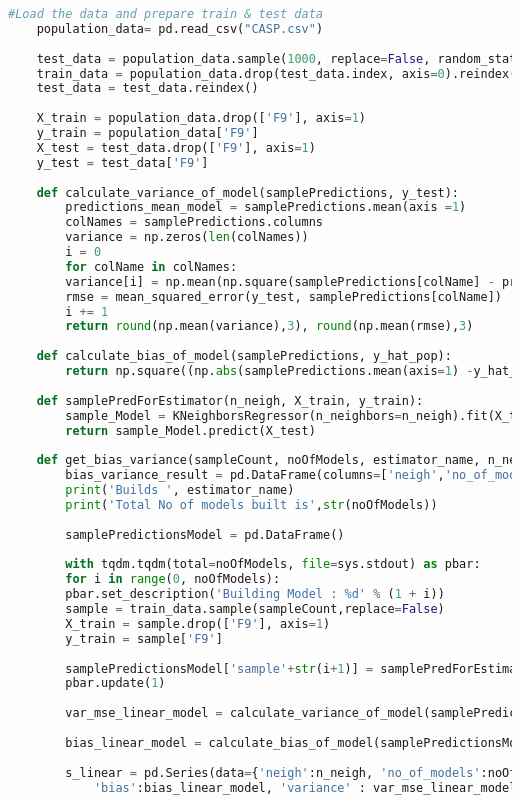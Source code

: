 \documentclass[a4paper]{article}
\begin{document}
\begin{appendices}
\begin{lstlisting}[language=Python]
	#Load the data and prepare train & test data
	population_data= pd.read_csv("CASP.csv")
	
	test_data = population_data.sample(1000, replace=False, random_state=100)
	train_data = population_data.drop(test_data.index, axis=0).reindex()
	test_data = test_data.reindex()
	
	X_train = population_data.drop(['F9'], axis=1)
	y_train = population_data['F9']
	X_test = test_data.drop(['F9'], axis=1)
	y_test = test_data['F9']
	
	def calculate_variance_of_model(samplePredictions, y_test):
		predictions_mean_model = samplePredictions.mean(axis =1)
		colNames = samplePredictions.columns
		variance = np.zeros(len(colNames))
		i = 0
		for colName in colNames:
		variance[i] = np.mean(np.square(samplePredictions[colName] - predictions_mean_model))
		rmse = mean_squared_error(y_test, samplePredictions[colName])
		i += 1
		return round(np.mean(variance),3), round(np.mean(rmse),3)
	
	def calculate_bias_of_model(samplePredictions, y_hat_pop):
		return np.square((np.abs(samplePredictions.mean(axis=1) -y_hat_pop).mean()))
	
	def samplePredForEstimator(n_neigh, X_train, y_train):
		sample_Model = KNeighborsRegressor(n_neighbors=n_neigh).fit(X_train, y_train)
		return sample_Model.predict(X_test)
	
	def get_bias_variance(sampleCount, noOfModels, estimator_name, n_neigh):
		bias_variance_result = pd.DataFrame(columns=['neigh','no_of_models','algorithm','bias','variance', 'mse'])
		print('Builds ', estimator_name)
		print('Total No of models built is',str(noOfModels))
	
		samplePredictionsModel = pd.DataFrame()
		
		with tqdm.tqdm(total=noOfModels, file=sys.stdout) as pbar:
		for i in range(0, noOfModels):
		pbar.set_description('Building Model : %d' % (1 + i))
		sample = train_data.sample(sampleCount,replace=False)
		X_train = sample.drop(['F9'], axis=1)
		y_train = sample['F9']
		
		samplePredictionsModel['sample'+str(i+1)] = samplePredForEstimator(n_neigh, X_train, y_train)
		pbar.update(1)
		
		var_mse_linear_model = calculate_variance_of_model(samplePredictionsModel, y_test)
		
		bias_linear_model = calculate_bias_of_model(samplePredictionsModel, y_test)
		
		s_linear = pd.Series(data={'neigh':n_neigh, 'no_of_models':noOfModels, 'algorithm':'KNN',
			'bias':bias_linear_model, 'variance' : var_mse_linear_model[0], 'mse' : var_mse_linear_model[1]}, name = 0)
		

\end{lstlisting}
\end{appendices}
\end{document}
